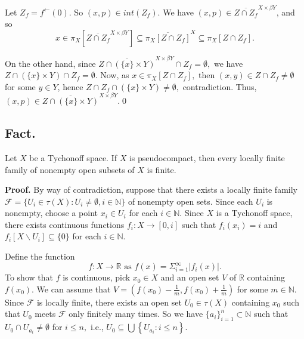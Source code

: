 \documentclass{article}
\begin{document}
\vskip 15pt

Let $Z_f=f^{\leftarrow}(0).$ So $(x,p)\in int(Z_f)$. We have $(x,p)\in \overline{Z\cap Z_f}^{X\times \beta Y}$, and so
$$x\in \pi_X\left[\overline{Z\cap Z_f}^{X\times \beta Y}\right] \subseteq \overline{\pi_X\left[Z\cap Z_f\right]}^X \subseteq \pi_X\left[Z\cap Z_f\right].$$

\vskip 10pt

On the other hand, since $\overline{Z\cap(\{x\}\times Y)}^{X\times \beta Y} \cap Z_f = \emptyset, $ 
we have $Z\cap (\{x\}\times Y) \cap Z_f=\emptyset$. Now, as $x\in \pi_X\left[Z\cap Z_f\right],$ then $(x,y)\in Z\cap Z_f\neq \emptyset$ for some $y\in Y$, hence 
$Z\cap Z_f\cap (\{x\}\times Y) \neq \emptyset,$  contradiction. Thus, $(x,p)\in \overline{Z\cap (\{x\}\times Y)}^{X\times \beta Y}.$\qed








\vskip 40pt






\subsection{Fact.} Let $X$ be a Tychonoff space. If $X$ is pseudocompact, then every locally finite family of nonempty open subsets of $X$ is finite.

\vskip 20pt

\textbf{Proof.} By way of contradiction, suppose that there exists a locally finite family $\mathcal{F}=\{U_i \in \tau(X): U_i\neq \emptyset, i\in \mathbb{N}\}$ of nonempty open sets. Since each $U_i$ is nonempty, choose a point $x_i\in U_i$ for each $i\in \mathbb{N}$. Since 
$X$ is a Tychonoff space, there exists continuous functions $f_i:X \rightarrow [0,i]$ such that $f_i(x_i)=i$ and 
$f_i[X \backslash U_i] \subseteq \{0\}$ for each $i \in \mathbb{N}$.

\vskip 20pt

 Define the function $$f:X\rightarrow \mathbb{R} \mbox{ as } f(x)=\Sigma_{i=1}^\infty |f_i(x)|.$$ To show that $f$ is continuous, pick $x_0\in X$ and an open set $V$ of $\mathbb{R}$ containing $f(x_0)$. 
We can assume that  $V=(f(x_0)-\frac{1}{m}, f(x_0)+\frac{1}{m})$ for some $m \in \mathbb{N}$.
Since $\mathcal{F}$ is locally finite, there exists an open set $U_0 \in \tau(X)$ containing $x_0$ such that $U_0$ meets $\mathcal{F}$ only finitely many times. 
So we have $\{a_i\}_{i=1}^{n} \subset \mathbb{N}$ such that $U_0\cap U_{a_i} \neq \emptyset$ for $i\leq n,$ i.e., $U_0\subseteq \bigcup \left\{U_{a_i}: i\leq n\right\}.$
\end{document}
